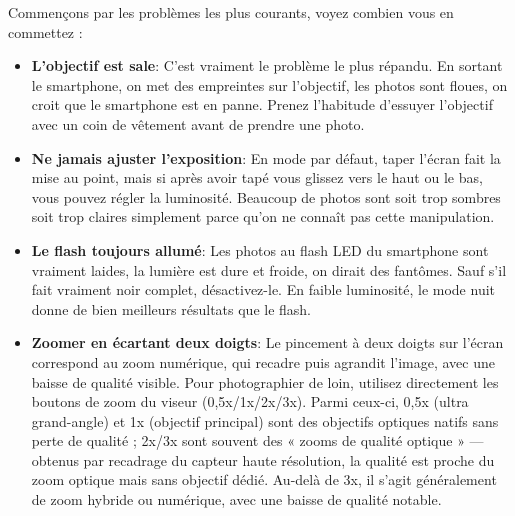 


Commençons par les problèmes les plus courants, voyez combien vous en commettez :

\begin{itemize}
  \item \textbf{L'objectif est sale}: C'est vraiment le problème le plus répandu. En sortant le smartphone, on met des empreintes sur l'objectif, les photos sont floues, on croit que le smartphone est en panne. Prenez l'habitude d'essuyer l'objectif avec un coin de vêtement avant de prendre une photo.
  \item \textbf{Ne jamais ajuster l'exposition}: En mode par défaut, taper l'écran fait la mise au point, mais si après avoir tapé vous glissez vers le haut ou le bas, vous pouvez régler la luminosité. Beaucoup de photos sont soit trop sombres soit trop claires simplement parce qu'on ne connaît pas cette manipulation.
  \item \textbf{Le flash toujours allumé}: Les photos au flash LED du smartphone sont vraiment laides, la lumière est dure et froide, on dirait des fantômes. Sauf s'il fait vraiment noir complet, désactivez-le. En faible luminosité, le mode nuit donne de bien meilleurs résultats que le flash.
  \item \textbf{Zoomer en écartant deux doigts}: Le pincement à deux doigts sur l'écran correspond au zoom numérique, qui recadre puis agrandit l'image, avec une baisse de qualité visible. Pour photographier de loin, utilisez directement les boutons de zoom du viseur (0,5x/1x/2x/3x). Parmi ceux-ci, 0,5x (ultra grand-angle) et 1x (objectif principal) sont des objectifs optiques natifs sans perte de qualité ; 2x/3x sont souvent des « zooms de qualité optique » — obtenus par recadrage du capteur haute résolution, la qualité est proche du zoom optique mais sans objectif dédié. Au-delà de 3x, il s'agit généralement de zoom hybride ou numérique, avec une baisse de qualité notable.
\end{itemize}


